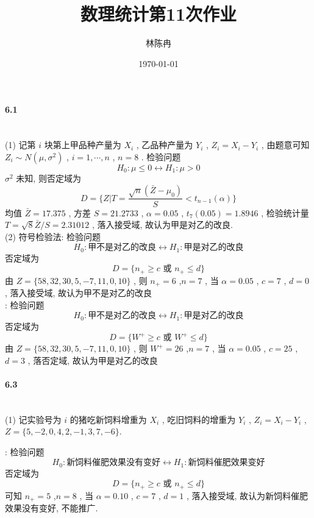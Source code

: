 \documentclass[UTF8]{ctexart}
\title{数理统计第11次作业}
\author{林陈冉}
\date{\today}
\begin{document}
    \maketitle
    \paragraph{6.1}\quad\\
        \noindent(1) 记第 $i$ 块第上甲品种产量为 $X_i$ , 乙品种产量为 $Y_i$ , $Z_i=X_i-Y_i$ , 由题意可知 $Z_i\sim N(\mu, \sigma^2)$ , $i=1, \cdots, n$ , $n=8$ . 检验问题
        \[H_0:\mu \le 0 \leftrightarrow H_1:\mu > 0\]
        $\sigma^2$ 未知, 则否定域为 
        \[D=\{Z|T=\frac{\sqrt{n}(\bar{Z}-\mu_0)}{S}<t_{n-1}(\alpha)\}\]
        均值 $\bar{Z}=17.375$ , 方差 $S=21.2733$ , $\alpha=0.05$ , $t_{7}(0.05)=1.8946$ , 检验统计量 $T=\sqrt{8}\bar{Z}/S=2.31012$ ,
        落入接受域, 故认为甲是对乙的改良.\\

        \noindent(2) 符号检验法: 检验问题
        \[H_0 : \text{甲不是对乙的改良} \leftrightarrow H_1 : \text{甲是对乙的改良}\]
        否定域为
        \[D=\{n_+ \ge c \text{ 或 } n_+ \le d\}\]
        由 $Z = \{58, 32, 30, 5, -7, 11, 0, 10\}$ , 则 $n_+ = 6$ ,$n = 7$ , 当 $\alpha = 0.05$ , $c = 7$ , $d = 0$ ,
        落入接受域, 故认为甲不是对乙的改良\\

        : 检验问题
        \[H_0 : \text{甲不是对乙的改良} \leftrightarrow H_1 : \text{甲是对乙的改良}\]
        否定域为
        \[D=\{W^+ \ge c \text{ 或 } W^+ \le d\}\]
        由 $Z = \{58, 32, 30, 5, -7, 11, 0, 10\}$ , 则 $W^+ = 26$ ,$n = 7$ , 当 $\alpha = 0.05$ , $c = 25$ , $d = 3$ ,
        落否定域, 故认为甲是对乙的改良\\
     
     \paragraph{6.3}\quad\\
        \noindent(1) 记实验号为 $i$ 的猪吃新饲料增重为 $X_i$ , 吃旧饲料的增重为 $Y_i$ , $Z_i=X_i-Y_i$ , $Z=\{5,-2,0,4,2,-1,3,7,-6\}$.

        : 检验问题
        \[H_0 : \text{新饲料催肥效果没有变好} \leftrightarrow H_1 : \text{新饲料催肥效果变好}\]
        否定域为
        \[D=\{n_+ \ge c \text{ 或 } n_+ \le d\}\]
        可知 $n_+ = 5$ ,$n = 8$ , 当 $\alpha = 0.10$ , $c = 7$ , $d = 1$ ,
        落入接受域, 故认为新饲料催肥效果没有变好, 不能推广.\\
\end{document}
